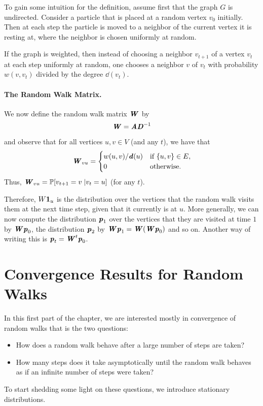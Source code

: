 To gain some intuition for the definition,  assume first that the graph $G$ is undirected. Consider a {\color{red}particle} that is placed at a random vertex $v_0$ initially. Then at each step the particle is moved to a neighbor of the current vertex it is resting at, where the neighbor is chosen uniformly at random. 

If the graph is weighted, then instead of choosing a neighbor $v_{t+1}$ of a vertex $v_t$ at each step uniformly at random, one chooses a neighbor $v$ of $v_t$ with probability $w(v,v_t)$ divided by the degree $\dd(v_t)$.

\paragraph{The Random Walk Matrix.} We now define the random walk matrix $\boldsymbol{\mathit{W}}$ by
\[
    \boldsymbol{\mathit{W}} = \boldsymbol{\mathit{A}} \boldsymbol{\mathit{D}}^{-1}
\]
and observe that for all vertices $u,v \in V$ (and any $t$), we have that 
\[
\boldsymbol{\mathit{W}}_{vu} = \begin{cases}
    w(u,v)/\boldsymbol{\mathit{d}}(u) & \text{if } \{u,v\} \in E,\\
    0 & \text{otherwise}.
\end{cases}
\]
Thus, $\boldsymbol{\mathit{W}}_{vu} = \mathbb{P}[v_{t+1} = v \; | v_t = u]$ (for any $t$). 

Therefore, $W \boldsymbol{1}_u$ is the distribution over the vertices that the random walk visits them at the next time step, given that it currently is at $u$. More generally, we can now compute the distribution $\boldsymbol{\mathit{p}}_1$ over the vertices that they are visited at time $1$ by $\boldsymbol{\mathit{W}} \boldsymbol{\mathit{p}}_0$, the distribution $\boldsymbol{\mathit{p}}_2$ by $\boldsymbol{\mathit{W}} \boldsymbol{\mathit{p}}_1 = \boldsymbol{\mathit{W}} ( \boldsymbol{\mathit{W}} \boldsymbol{\mathit{p}}_0)$ and so on. Another way of writing this is $\boldsymbol{\mathit{p}}_t = \boldsymbol{\mathit{W}}^t \boldsymbol{\mathit{p}}_{0}$.

\section{Convergence Results for Random Walks}

In this first part of the chapter, we are interested mostly in convergence of random walks that is the two questions:
\begin{itemize}
	\item How does a random walk behave after a large number of steps are taken? 
	\item How many steps does it take asymptotically until the random walk behaves as if an infinite number of steps were taken?
\end{itemize}

To start shedding some light on these questions, we introduce stationary distributions.

